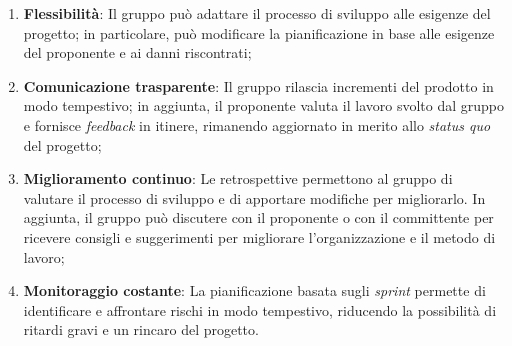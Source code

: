 \begin{enumerate}
	\item \textbf{Flessibilità}: Il gruppo può adattare il processo di sviluppo
	      alle esigenze del progetto; in particolare, può modificare la
	      pianificazione in base alle esigenze del proponente e ai danni
	      riscontrati;

	\item \textbf{Comunicazione trasparente}: Il gruppo rilascia incrementi del
	      prodotto in modo tempestivo; in aggiunta, il proponente valuta il
	      lavoro svolto dal gruppo e fornisce \textit{feedback} in itinere,
	      rimanendo aggiornato in merito allo \textit{status quo} del
	      progetto;

	\item \textbf{Miglioramento continuo}: Le retrospettive permettono al
	      gruppo di valutare il processo di sviluppo e di apportare
	      modifiche per migliorarlo. In aggiunta, il gruppo può
	      discutere con il proponente o con il committente per ricevere consigli
	      e suggerimenti per migliorare l'organizzazione e il metodo di lavoro;

	\item \textbf{Monitoraggio costante}: La pianificazione basata sugli
	      \textit{sprint} permette di identificare e affrontare rischi in modo
	      tempestivo, riducendo la possibilità di ritardi gravi e un rincaro del
	      progetto.
\end{enumerate}
